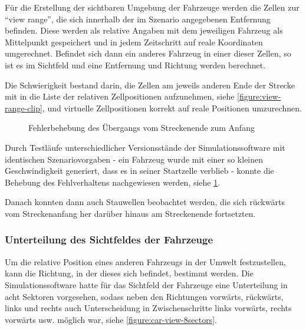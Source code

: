 Für die Erstellung der sichtbaren Umgebung der Fahrzeuge werden die Zellen zur \enquote{view range}, die sich innerhalb der im Szenario angegebenen Entfernung befinden.
Diese werden als relative Angaben mit dem jeweiligen Fahrzeug als Mittelpunkt gespeichert und in jedem Zeitschritt auf reale Koordinaten umgerechnet.
Befindet sich dann ein anderes Fahrzeug in einer dieser Zellen, so ist es im Sichtfeld und eine Entfernung und Richtung werden berechnet.

Die Schwierigkeit bestand darin, die Zellen am jeweils anderen Ende der Strecke mit in die Liste der relativen Zellpositionen aufzunehmen, siehe \cref{figure:view-range-clip}, und virtuelle Zellpositionen korrekt auf reale Positionen umzurechnen.

\begin{figure}[hptb]
  \centering
     \qquad 
  \caption[Fehlerbehebung: Übergang vom Streckenende zum Anfang]
          {Fehlerbehebung des Übergangs vom Streckenende zum Anfang}
  \label{figure:go-negative}
\end{figure}

Durch Testläufe unterschiedlicher Versionsstände der Simulationssoftware mit identischen Szenariovorgaben - ein Fahrzeug wurde mit einer so kleinen Geschwindigkeit generiert, dass es in seiner Startzelle verblieb - konnte die Behebung des Fehlverhaltens nachgewiesen werden, siehe \cref{figure:go-negative}.

Danach konnten dann auch Stauwellen beobachtet werden, die sich rückwärts vom Streckenanfang her darüber hinaus am Streckenende fortsetzten.



\subsubsection{Unterteilung des Sichtfeldes der Fahrzeuge}
\label{sec:unterteilung-sichtfeld}

Um die relative Position eines anderen Fahrzeugs in der Umwelt festzustellen, kann die Richtung, in der dieses sich befindet, bestimmt werden.
Die Simulationssoftware hatte für das Sichtfeld der Fahrzeuge eine Unterteilung in acht Sektoren vorgesehen, sodass neben den Richtungen vorwärts, rückwärts, links und rechts auch Unterscheidung in Zwischenschritte links vorwärts, rechts vorwärts usw. möglich war, siehe \cref{figure:car-view-8sectors}.

